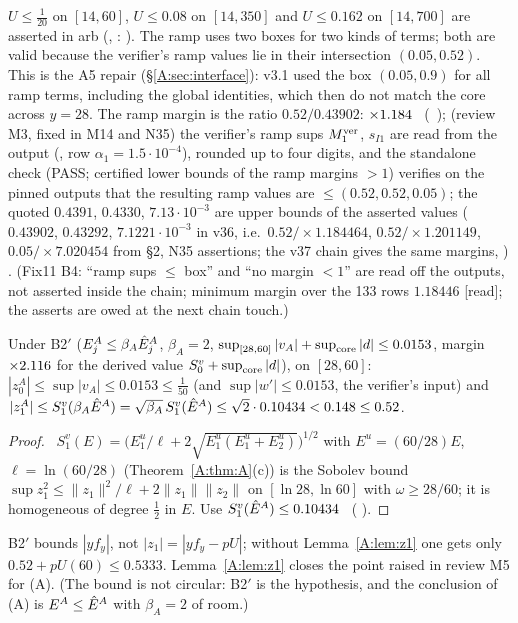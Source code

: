 \documentclass[11pt]{article}
\begin{document}
$U\le\frac1{20}$ on $[14,60]$, $U\le0.08$ on $[14,350]$ and $U\le0.162$ on $[14,700]$ are asserted in arb (, : ). The ramp uses two boxes for two kinds of terms; both are valid because the verifier's ramp values lie in their intersection $(0.05,0.52)$. This is the A5 repair (\S\ref{A:sec:interface}): v3.1 used the box $(0.05,0.9)$ for all ramp terms, including the global identities, which then do not match the core across $y=28$. The ramp margin is the ratio $0.52/0.43902$: $\times1.184$ \tC\ (\SA\ ); (review M3, fixed in M14 and N35) the verifier's ramp sups $M_1^{\rm ver}$, $s_{I1}$ are read from the  output (, row $\alpha_1=1.5\cdot10^{-4}$), rounded up to four digits, and the standalone check  (PASS; certified lower bounds of the ramp margins $>1$) verifies on the pinned outputs that the resulting ramp values are $\le(0.52,0.52,0.05)$; the quoted $0.4391$, $0.4330$, $7.13\cdot10^{-3}$ are upper bounds of the asserted values ($0.43902$, $0.43292$, $7.1221\cdot10^{-3}$ in v36, i.e.\ $0.52/\times1.184464$, $0.52/\times1.201149$, $0.05/\times7.020454$ from  \S2, N35 assertions; the v37 chain gives the same margins, ) \tC. (Fix11 B4: ``ramp sups $\le$ box'' and ``no margin $<1$'' are read off the outputs, not asserted inside the chain; minimum margin over the 133 rows $1.18446$ [read]; the asserts are owed at the next chain touch.)

\begin{lemma}\label{A:lem:z1}
Under B2$'$ ($E^A_j\le\beta_A\hat E^A_j$, $\beta_A=2$, $\sup_{[28,60]}|v_A|+\sup_{\rm core}|d|\le0.0153$, margin $\times2.116$ for the derived value $S^v_0+\sup_{\rm core}|d|$), on $[28,60]$: $|z^A_0|\le\sup|v_A|\le0.0153\le\frac1{50}$ (and $\sup|w'|\le0.0153$, the verifier's input) and $|z^A_1|\le S^v_1(\beta_A\hat E^A)=\sqrt{\beta_A}\,S^v_1(\hat E^A)\le\sqrt2\cdot0.10434<0.148\le0.52$.
\end{lemma}
\begin{proof}\tP\ $S^v_1(E)=\bigl(E^u_1/\ell+2\sqrt{E^u_1(E^u_1+E^u_2)}\bigr)^{1/2}$ with $E^u=(60/28)E$, $\ell=\ln(60/28)$ (Theorem~\ref{A:thm:A}(c)) is the Sobolev bound $\sup z_1^2\le\|z_1\|^2/\ell+2\|z_1\|\|z_2\|$ on $[\ln28,\ln60]$ with $\omega\ge28/60$; it is homogeneous of degree $\frac12$ in $E$. Use $S^v_1(\hat E^A)\le0.10434$ \tC\ ( ).
\end{proof}
\noindent B2$'$ bounds $|yf_y|$, not $|z_1|=|yf_y-pU|$; without Lemma~\ref{A:lem:z1} one gets only $0.52+pU(60)\le0.5333$. Lemma~\ref{A:lem:z1} closes the point raised in review M5 for (A). (The bound is not circular: B2$'$ is the hypothesis, and the conclusion of (A) is $E^A\le\hat E^A$ with $\beta_A=2$ of room.)
\end{document}
